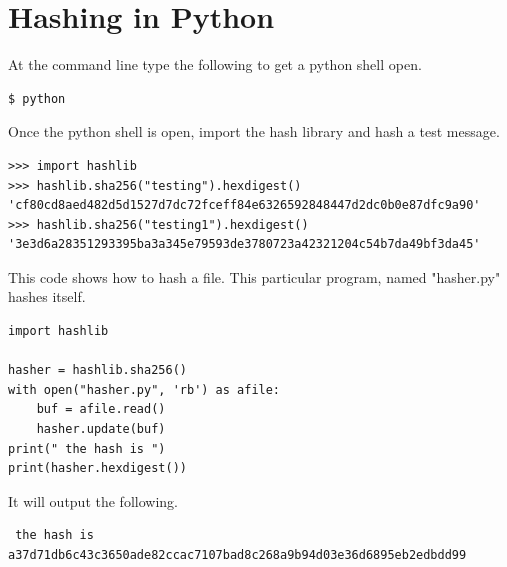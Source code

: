 \documentclass{tufte-handout}
\begin{document}
\section{Hashing in Python}
At the command line type the following to get a python shell open.
\small
\begin{shaded}
\begin{verbatim}
$ python
\end{verbatim}
\end{shaded}
\normalsize
Once the python shell is open, import the hash library and hash a test message.
\small
\begin{shaded}
\begin{verbatim}
>>> import hashlib
>>> hashlib.sha256("testing").hexdigest()
'cf80cd8aed482d5d1527d7dc72fceff84e6326592848447d2dc0b0e87dfc9a90'
>>> hashlib.sha256("testing1").hexdigest()
'3e3d6a28351293395ba3a345e79593de3780723a42321204c54b7da49bf3da45'
\end{verbatim}
\end{shaded}
\normalsize
This code shows how to hash a file.  This particular program, named "hasher.py" hashes itself.
\small
\begin{framed}
\begin{verbatim}
import hashlib

hasher = hashlib.sha256()
with open("hasher.py", 'rb') as afile:
    buf = afile.read()
    hasher.update(buf)
print(" the hash is ")
print(hasher.hexdigest())
\end{verbatim}
\end{framed}


\normalsize
It will output the following.
\small
\begin{shaded}
\begin{verbatim}
 the hash is 
a37d71db6c43c3650ade82ccac7107bad8c268a9b94d03e36d6895eb2edbdd99
\end{verbatim}
\end{shaded}
\end{document}
